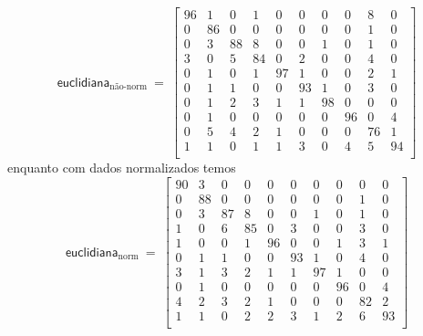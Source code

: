 \documentclass[10pt,a4paper,twocolumn]{article}
\begin{document}
      \begin{equation*}
        \textsf{euclidiana}_\text{não-norm}~=~ \left [
        \begin{smallmatrix}
          96 &  1 &  0 &  1 &  0 &  0 &  0 &  0 &  8 &  0 \\
           0 & 86 &  0 &  0 &  0 &  0 &  0 &  0 &  1 &  0 \\ 
           0 &  3 & 88 &  8 &  0 &  0 &  1 &  0 &  1 &  0 \\ 
           3 &  0 &  5 & 84 &  0 &  2 &  0 &  0 &  4 &  0 \\ 
           0 &  1 &  0 &  1 & 97 &  1 &  0 &  0 &  2 &  1 \\ 
           0 &  1 &  1 &  0 &  0 & 93 &  1 &  0 &  3 &  0 \\ 
           0 &  1 &  2 &  3 &  1 &  1 & 98 &  0 &  0 &  0 \\ 
           0 &  1 &  0 &  0 &  0 &  0 &  0 & 96 &  0 &  4 \\ 
           0 &  5 &  4 &  2 &  1 &  0 &  0 &  0 & 76 &  1 \\ 
           1 &  1 &  0 &  1 &  1 &  3 &  0 &  4 &  5 & 94 \\ 
        \end{smallmatrix} \right ]
      \end{equation*}
      enquanto com dados normalizados temos
      \begin{equation*}
        \textsf{euclidiana}_\text{norm}~=~ \left [
        \begin{smallmatrix}
          90 &  3 &  0 &  0 &  0 &  0 &  0 &  0 &  0 &  0 \\
           0 & 88 &  0 &  0 &  0 &  0 &  0 &  0 &  1 &  0 \\ 
           0 &  3 & 87 &  8 &  0 &  0 &  1 &  0 &  1 &  0 \\ 
           1 &  0 &  6 & 85 &  0 &  3 &  0 &  0 &  3 &  0 \\ 
           1 &  0 &  0 &  1 & 96 &  0 &  0 &  1 &  3 &  1 \\ 
           0 &  1 &  1 &  0 &  0 & 93 &  1 &  0 &  4 &  0 \\ 
           3 &  1 &  3 &  2 &  1 &  1 & 97 &  1 &  0 &  0 \\ 
           0 &  1 &  0 &  0 &  0 &  0 &  0 & 96 &  0 &  4 \\ 
           4 &  2 &  3 &  2 &  1 &  0 &  0 &  0 & 82 &  2 \\ 
           1 &  1 &  0 &  2 &  2 &  3 &  1 &  2 &  6 & 93 \\ 
        \end{smallmatrix} \right ]
      \end{equation*}
      
\end{document}
